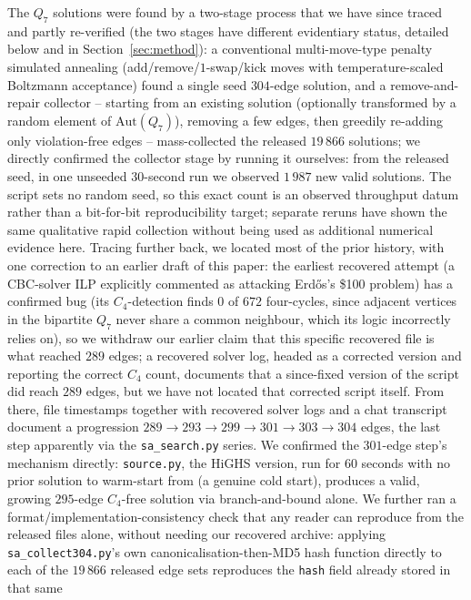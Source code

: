 \documentclass[12pt,a4paper]{article}
\theoremstyle{definition}
\begin{document}
The $Q_7$ solutions were found by a two-stage process that we have
since traced and partly re-verified (the two stages have different
evidentiary status, detailed below and in Section~\ref{sec:method}):
a conventional multi-move-type
penalty simulated annealing (add/remove/$1$-swap/kick moves with
temperature-scaled Boltzmann acceptance) found a single seed $304$-edge
solution, and a remove-and-repair collector -- starting from an
existing solution (optionally transformed by a random element of
$\mathrm{Aut}(Q_7)$), removing a few edges, then greedily re-adding
only violation-free edges -- mass-collected the released $19\,866$
solutions; we directly confirmed the collector stage by running it
ourselves: from the released seed, in one unseeded $30$-second run we
observed $1\,987$ new valid solutions. The script sets no random seed,
so this exact count is an observed throughput datum rather than a
bit-for-bit reproducibility target; separate reruns have shown the same
qualitative rapid collection without being used as additional numerical
evidence here. Tracing further
back, we located most of the prior history, with one correction
to an earlier draft of this paper: the
earliest recovered attempt (a CBC-solver ILP explicitly commented as
attacking Erd\H{o}s's \hbox{\$}100 problem) has a confirmed bug (its
$C_4$-detection finds $0$ of $672$ four-cycles, since adjacent
vertices in the bipartite $Q_7$ never share a common neighbour, which
its logic incorrectly relies on), so we withdraw our earlier claim
that this specific recovered file is what reached $289$ edges; a
recovered solver log, headed as a corrected version and reporting the
correct $C_4$ count, documents that a since-fixed version of the
script did reach $289$ edges, but we have not located that corrected
script itself. From there, file timestamps together with recovered solver
logs and a chat transcript document a progression $289\to293\to299\to301\to303\to304$ edges, the last
step apparently via the \texttt{sa\_search.py} series. We confirmed
the $301$-edge step's mechanism directly: \texttt{source.py}, the
HiGHS version, run for $60$ seconds with no prior solution to warm-start
from (a genuine cold start), produces a valid, growing $295$-edge
$C_4$-free solution via branch-and-bound alone. We further ran a
format/implementation-consistency check that any reader can
reproduce from the released
files alone, without needing our recovered archive: applying
\texttt{sa\_collect304.py}'s own canonicalisation-then-MD5 hash
function directly to each of the $19\,866$ released edge sets
reproduces the \texttt{hash} field already stored in that same
\end{document}
